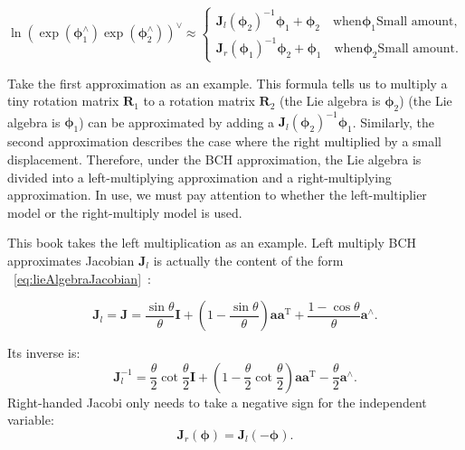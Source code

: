 \begin{equation}
\ln { \left( {\exp \left( { \boldsymbol{\phi} _1^ \wedge } \right)\exp \left( {\boldsymbol{\phi} _2^ \wedge } \right)} \right) ^ \vee } \approx \left\{ 
\begin{array}{l}
{\bm{J}_l}{\left( {{\boldsymbol{\phi} _2}} \right)^{ - 1}}{ \boldsymbol{\phi} _1} + {\boldsymbol{\phi} _2} \quad \text{when} \boldsymbol{\phi}_1 \text{Small amount},\\
{\bm{J}_r}{\left( {{\boldsymbol{\phi} _1}} \right)^{ - 1}}{\boldsymbol{\phi} _2} + {\boldsymbol{\phi} _1} \quad \text{when} \boldsymbol{\phi}_2 \text{Small amount}.
\end{array} \right.
\end{equation}

Take the first approximation as an example.
This formula tells us to multiply a tiny rotation matrix $\bm{R}_1$ to a rotation matrix $\bm{R}_2$ (the Lie algebra is $\boldsymbol{\phi}_2$) (the Lie algebra is $\boldsymbol{\phi} _1$) can be approximated by adding a ${\bm{J}_l}{\left( {{\boldsymbol{\phi} _2}} \right)^{ - 1}}{ \boldsymbol{\phi} _1}$.
Similarly, the second approximation describes the case where the right multiplied by a small displacement. Therefore, under the BCH approximation, the Lie algebra is divided into a left-multiplying approximation and a right-multiplying approximation. In use, we must pay attention to whether the left-multiplier model or the right-multiply model is used.

This book takes the left multiplication as an example. Left multiply BCH  approximates Jacobian $\bm{J}_l$ is actually the content of the form ~\eqref{eq:lieAlgebraJacobian}~:

\begin{equation} 
{ \bm{J}_l} = \bm{J} = \frac{{\sin \theta }}{\theta } \bm{I} + \left( {1 - \frac{{\sin \theta }}{\theta }} \right) \bm{a} { \bm{a}^\mathrm{T}} + \frac{{1 - \cos \theta }}{\theta }{ \bm{a}^ \wedge}.
\end{equation}

Its inverse is:
\begin{equation}
\bm{J}_l^{ - 1} = \frac{\theta }{2}\cot \frac{\theta }{2} \bm{I} + \left( {1 - \frac{\theta }{2}\cot \frac{\theta }{2}} \right) \bm{a} {\bm{a}^\mathrm{T}} - \frac{\theta }{2}{ \bm{a}^ \wedge }.
\end{equation}
Right-handed Jacobi only needs to take a negative sign for the independent variable:
\begin{equation}
\bm{J}_r(\boldsymbol{\phi}) =\bm{J}_l(-\boldsymbol{\phi}) .
\end{equation}

